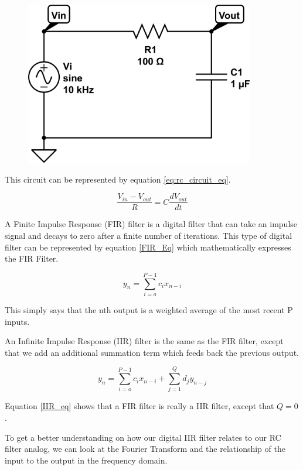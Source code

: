 {\begin{figure}[h!tb] 
\centering
\includegraphics[width=10cm]{Images/rc-circuit.png}
\label{rc_circuit}
\end{figure}
}

This circuit can be represented by equation \ref{eq:rc_circuit_eq}.

\begin{equation}\label{eq:rc_circuit_eq}
\frac{V_{in}-V_{out}}{R}=C\frac{dV_{out}}{dt}
\end{equation}

A Finite Impulse Response (FIR) filter is a digital filter that can take an impulse signal and decays to zero after a finite number of iterations.  This type of digital filter can be represented by equation \ref{FIR_Eq} which mathematically expresses the FIR Filter.

\begin{equation}\label{FIR_Eq}
y_n=\displaystyle\sum\limits_{i=o}^{P-1} c_ix_{n-i}
\end{equation}

This simply says that the nth output is a weighted average of the most recent P inputs.  

An Infinite Impulse Response (IIR) filter is the same as the FIR filter, except that we add an additional summation term which feeds back the previous output.

\begin{equation}\label{IIR_eq}
y_n=\displaystyle\sum\limits_{i=o}^{P-1} c_ix_{n-i}+\displaystyle\sum\limits_{j=1}^{Q} d_jy_{n-j}
\end{equation}

Equation \ref{IIR_eq} shows that a FIR filter is really a IIR filter, except that $Q=0$.  

To get a better understanding on how our digital IIR filter relates to our RC filter analog, we can look at the Fourier Transform and the relationship of the input to the output in the frequency domain.

